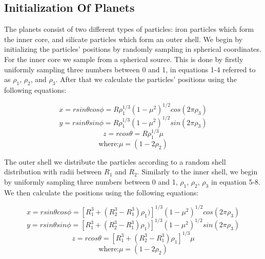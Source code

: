 \documentclass[a4paper]{article}
\begin{document}
\subsection{Initialization Of Planets}

The planets consist of two different types of particles: iron particles which form the inner core, and silicate particles which form an outer shell. 
We begin by initializing the particles' positions by randomly sampling in spherical coordinates. 
For the inner core we sample from a spherical source. 
This is done by firstly uniformly sampling three numbers between 0 and 1, in equations 1-4 referred to as $\rho_1$, $\rho_2$, and $\rho_3$. 
After that we calculate the particles' positions using the following equations:

\begin{equation}
x = rsin\theta cos\phi = R\rho^{1/3}_{1}(1-\mu^{2})^{1/2}cos(2\pi\rho_{3})
\end{equation}
\begin{equation}
y = rsin\theta sin\phi = R\rho^{1/3}_{1}(1-\mu^{2})^{1/2}sin(2\pi\rho_{3})
\end{equation}
\begin{equation}
z = rcos\theta = R\rho^{1/3}_{1}\mu
\end{equation}
\begin{equation}
\text{where:} \mu = (1-2\rho_2)
\end{equation}

The outer shell we distribute the particles according to a random shell distribution with radii between $R_1$ and $R_2$. 
Similarly to the inner shell, we begin by uniformly sampling three numbers between 0 and 1, $\rho_1$, $\rho_2$, $\rho_3$ in equation 5-8. 
We then calculate the positions using the following equations:

\begin{equation}
x = rsin\theta cos\phi = [R^3_1 + (R^3_2 - R^3_1)\rho_1)]^{1/3}(1 - \mu^2)^{1/2}cos(2\pi\rho_3)
\end{equation}
\begin{equation}
y = rsin\theta sin\phi = [R^3_1 + (R^3_2 - R^3_1)\rho_1)]^{1/3}(1 - \mu^2)^{1/2}sin(2\pi\rho_3)
\end{equation}
\begin{equation}
z = rcos\theta = [R^3_1 + (R^3_2 - R^3_1)\rho_1]^{1/3}\mu
\end{equation}
\begin{equation}
\text{where:} \mu = (1-2\rho_2)
\end{equation}
\end{document}
